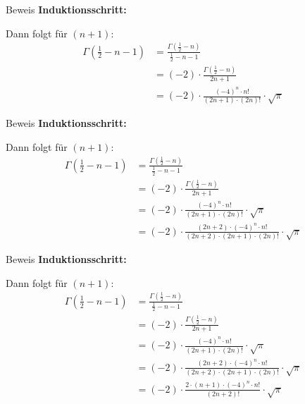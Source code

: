 \documentclass[10pt]{beamer}
\begin{document}
\begin{frame}{Beweis}
    \textbf{Induktionsschritt:}

    Dann folgt für \( \left( n + 1 \right) \):
    \begin{align*}
        \Gamma\left( \frac{1}{2} - n - 1  \right)
        & = \frac{\Gamma\left( \frac{1}{2} - n \right)}{\frac{1}{2} - n - 1} \\
        & = \left( - 2 \right) \cdot \frac{\Gamma\left( \frac{1}{2} - n \right)}{2n + 1} \\
        & = \left( - 2 \right) \cdot \frac{\left( - 4 \right)^{n} \cdot n!}{\left( 2n + 1 \right) \cdot \left( 2n \right)!} \cdot \sqrt{\pi}
    \end{align*}
\end{frame}



\begin{frame}{Beweis}
    \textbf{Induktionsschritt:}

    Dann folgt für \( \left( n + 1 \right) \):
    \begin{align*}
        \Gamma\left( \frac{1}{2} - n - 1  \right)
        & = \frac{\Gamma\left( \frac{1}{2} - n \right)}{\frac{1}{2} - n - 1} \\
        & = \left( - 2 \right) \cdot \frac{\Gamma\left( \frac{1}{2} - n \right)}{2n + 1} \\
        & = \left( - 2 \right) \cdot \frac{\left( - 4 \right)^{n} \cdot n!}{\left( 2n + 1 \right) \cdot \left( 2n \right)!} \cdot \sqrt{\pi} \\
        & = \left( - 2 \right) \cdot \frac{\left( 2n + 2 \right) \cdot \left( - 4 \right)^{n} \cdot n!}{\left( 2n + 2 \right) \cdot \left( 2n + 1 \right) \cdot \left( 2n \right)!} \cdot \sqrt{\pi}
    \end{align*}
\end{frame}



\begin{frame}{Beweis}
    \textbf{Induktionsschritt:}

    Dann folgt für \( \left( n + 1 \right) \):
    \begin{align*}
        \Gamma\left( \frac{1}{2} - n - 1  \right)
        & = \frac{\Gamma\left( \frac{1}{2} - n \right)}{\frac{1}{2} - n - 1} \\
        & = \left( - 2 \right) \cdot \frac{\Gamma\left( \frac{1}{2} - n \right)}{2n + 1} \\
        & = \left( - 2 \right) \cdot \frac{\left( - 4 \right)^{n} \cdot n!}{\left( 2n + 1 \right) \cdot \left( 2n \right)!} \cdot \sqrt{\pi} \\
        & = \left( - 2 \right) \cdot \frac{\left( 2n + 2 \right) \cdot \left( - 4 \right)^{n} \cdot n!}{\left( 2n + 2 \right) \cdot \left( 2n + 1 \right) \cdot \left( 2n \right)!} \cdot \sqrt{\pi} \\
        & = \left( - 2 \right) \cdot \frac{2 \cdot \left( n + 1 \right) \cdot \left( - 4 \right)^{n} \cdot n!}{\left( 2n + 2 \right)!} \cdot \sqrt{\pi}
    \end{align*}
\end{frame}
\end{document}

